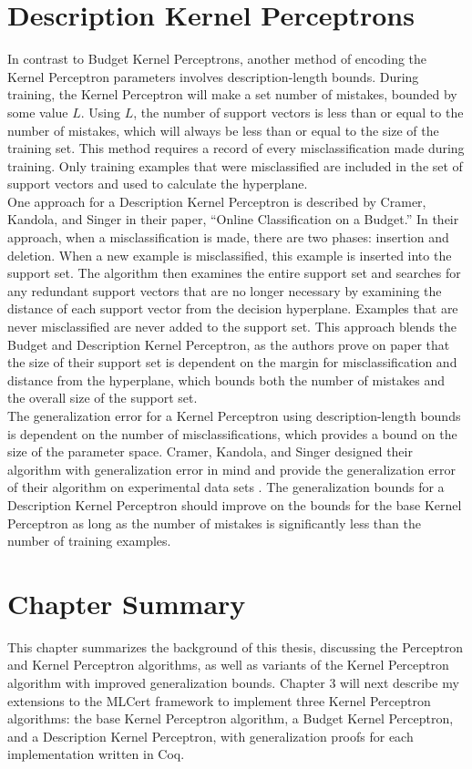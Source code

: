 \section{Description Kernel Perceptrons}\label{DescriptionKernelPerceptronSection}
In contrast to Budget Kernel Perceptrons, another method of encoding the Kernel Perceptron parameters involves description-length bounds. During training, the Kernel Perceptron will make a set number of mistakes, bounded by some value $L$. Using $L$, the number of support vectors is less than or equal to the number of mistakes, which will always be less than or equal to the size of the training set. This method requires a record of every misclassification made during training. Only training examples that were misclassified are included in the set of support vectors and used to calculate the hyperplane.
\\One approach for a Description Kernel Perceptron is described by Cramer, Kandola, and Singer \cite{CKS03} in their paper, ``Online Classification on a Budget.'' In their approach, when a misclassification is made, there are two phases: insertion and deletion. When a new example is misclassified, this example is inserted into the support set. The algorithm then examines the entire support set and searches for any redundant support vectors that are no longer necessary by examining the distance of each support vector from the decision hyperplane. Examples that are never misclassified are never added to the support set. This approach blends the Budget and Description Kernel Perceptron, as the authors prove on paper that the size of their support set is dependent on the margin for misclassification and distance from the hyperplane, which bounds both the number of mistakes and the overall size of the support set. 
\\The generalization error for a Kernel Perceptron using description-length bounds is dependent on the number of misclassifications, which provides a bound on the size of the parameter space. Cramer, Kandola, and Singer designed their algorithm with generalization error in mind and provide the generalization error of their algorithm on experimental data sets \cite{CKS03}. The generalization bounds for a Description Kernel Perceptron should improve on the bounds for the base Kernel Perceptron as long as the number of mistakes is significantly less than the number of training examples.
\section{Chapter Summary}\label{BackgroundChapterSummarySection}
This chapter summarizes the background of this thesis, discussing the Perceptron and Kernel Perceptron algorithms, as well as variants of the Kernel Perceptron algorithm with improved generalization bounds. Chapter 3 will next describe my extensions to the MLCert framework to implement three Kernel Perceptron algorithms: the base Kernel Perceptron algorithm, a Budget Kernel Perceptron, and a Description Kernel Perceptron, with generalization proofs for each implementation written in Coq.
